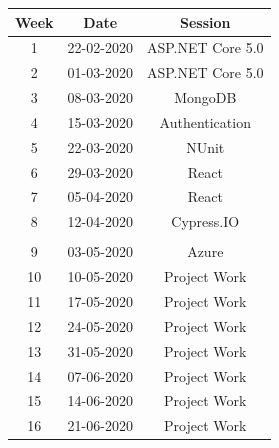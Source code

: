 \documentclass{article}
\begin{document}
\renewcommand{\arraystretch}{1.5}
\begin{tabular}{|c|c|c|c|}
	\hline
	\textbf{Week} & \textbf{Date}     & \multicolumn{2}{c|}{\textbf{Session}}        \\ \hline
	\small 1      & \small 22-02-2020 & \multicolumn{2}{c|}{\small ASP.NET Core 5.0} \\ \hline
	\small 2      & \small 01-03-2020 & \multicolumn{2}{c|}{\small ASP.NET Core 5.0} \\ \hline
	\small 3      & \small 08-03-2020 & \multicolumn{2}{c|}{\small MongoDB}          \\ \hline
	\small 4      & \small 15-03-2020 & \multicolumn{2}{c|}{\small Authentication}            \\ \hline
	\small 5      & \small 22-03-2020 & \multicolumn{2}{c|}{\small NUnit}   \\ \hline
	\small 6      & \small 29-03-2020 & \multicolumn{2}{c|}{\small React}            \\ \hline
	\small 7      & \small 05-04-2020 & \multicolumn{2}{c|}{\small React}            \\ \hline
	\small 8      & \small 12-04-2020 & \multicolumn{2}{c|}{\small Cypress.IO}       \\ \hline
	\rowcolor{yellow} \multicolumn{4}{|c|}{\small Mid Term Break}                    \\ \hline
	\small 9      & \small 03-05-2020 & \multicolumn{2}{c|}{\small Azure}            \\ \hline
	\small 10     & \small 10-05-2020 & \multicolumn{2}{c|}{\small Project Work}     \\ \hline
	\small 11     & \small 17-05-2020 & \multicolumn{2}{c|}{\small Project Work}     \\ \hline
	\small 12     & \small 24-05-2020 & \multicolumn{2}{c|}{\small Project Work}     \\ \hline
	\small 13     & \small 31-05-2020 & \multicolumn{2}{c|}{\small Project Work}     \\ \hline
	\small 14     & \small 07-06-2020 & \multicolumn{2}{c|}{\small Project Work}     \\ \hline
	\small 15     & \small 14-06-2020 & \multicolumn{2}{c|}{\small Project Work}     \\ \hline
	\small 16     & \small 21-06-2020 & \multicolumn{2}{c|}{\small Project Work}     \\ \hline
\end{tabular}
\end{document}
